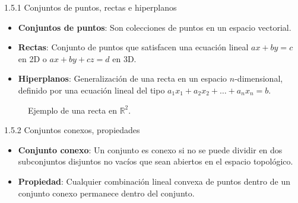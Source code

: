 \documentclass{beamer}
\begin{document}
\begin{frame}{1.5.1 Conjuntos de puntos, rectas e hiperplanos}
    \begin{itemize}
        \item \textbf{Conjuntos de puntos}: Son colecciones de puntos en un espacio vectorial.
        \pause
        \item \textbf{Rectas}: Conjunto de puntos que satisfacen una ecuación lineal \( ax + by = c \) en 2D o \( ax + by + cz = d \) en 3D.
        \pause
        \item \textbf{Hiperplanos}: Generalización de una recta en un espacio \( n \)-dimensional, definido por una ecuación lineal del tipo \( a_1x_1 + a_2x_2 + \dots + a_nx_n = b \).
    \end{itemize}
    
    \pause
    \begin{figure}
        \centering
        \caption{Ejemplo de una recta en \( \mathbb{R}^2 \).}
    \end{figure}
\end{frame}

\begin{frame}{1.5.2 Conjuntos conexos, propiedades}
    \begin{itemize}
        \item \textbf{Conjunto conexo}: Un conjunto es conexo si no se puede dividir en dos subconjuntos disjuntos no vacíos que sean abiertos en el espacio topológico.
        \pause
        \item \textbf{Propiedad}: Cualquier combinación lineal convexa de puntos dentro de un conjunto conexo permanece dentro del conjunto.
    \end{itemize}
    
    \pause
    \begin{figure}
        \centering
    \end{figure}
\end{frame}
\end{document}
